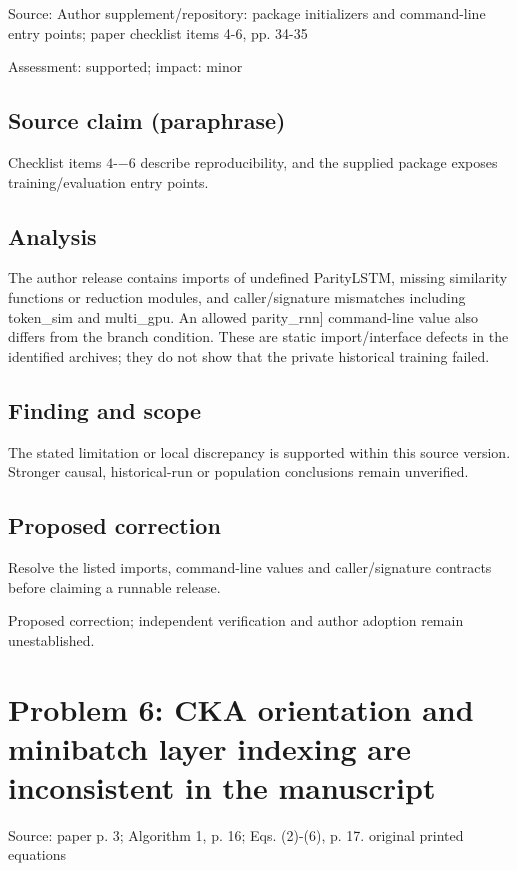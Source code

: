 \documentclass[11pt]{article}
\begin{document}
Source: Author supplement/repository: package initializers and command-line entry points; paper checklist items 4-6, pp. 34-35

Assessment: supported; impact: minor

\subsection*{Source claim (paraphrase)}

Checklist items \(4\)-\(-6\) describe reproducibility, and the supplied package exposes training/evaluation entry points.

\subsection*{Analysis}

The author release contains imports of undefined ParityLSTM, missing similarity functions or reduction modules, and caller/signature mismatches including token\_sim and multi\_gpu. An allowed parity\_rnn] command-line value also differs from the branch condition. These are static import/interface defects in the identified archives; they do not show that the private historical training failed.

\subsection*{Finding and scope}

The stated limitation or local discrepancy is supported within this source version. Stronger causal, historical-run or population conclusions remain unverified.

\subsection*{Proposed correction}

Resolve the listed imports, command-line values and caller/signature contracts before claiming a runnable release.

Proposed correction; independent verification and author adoption remain unestablished.

\section*{Problem 6: CKA orientation and minibatch layer indexing are inconsistent in the manuscript}

Source: paper p. 3; Algorithm 1, p. 16; Eqs. (2)-(6), p. 17. original printed equations
\end{document}
